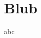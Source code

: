 \documentclass{beamer}
\begin{document}
\section{Blub}
\begin{frame}
    abc
\end{frame} 
\end{document}
